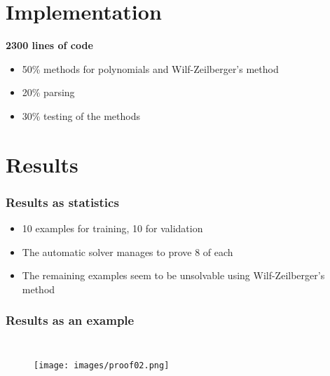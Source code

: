 \documentclass{beamer}
\begin{document}
\section{Implementation}
\begin{frame}
  \textbf{2300 lines of code}
  \pause
  \begin{itemize}
    \item 50\% methods for polynomials and Wilf-Zeilberger's method
    \pause
    \item 20\% parsing
    \pause
    \item 30\% testing of the methods
  \end{itemize}
\end{frame}

\section{Results}
\begin{frame}
  \frametitle{Results as statistics}
  \begin{itemize}
    \item 10 examples for training, 10 for validation
    \pause
    \item The automatic solver manages to prove 8 of each
    \pause
    \item The remaining examples seem to be unsolvable using Wilf-Zeilberger's method
  \end{itemize}
\end{frame}
\begin{frame}
  \frametitle{Results as an example}
  \begin{columns}[c]


  \begin{figure}
  \texttt{[image: images/proof02.png]}
  \end{figure}
  \end{columns}
\end{frame}
\end{document}
